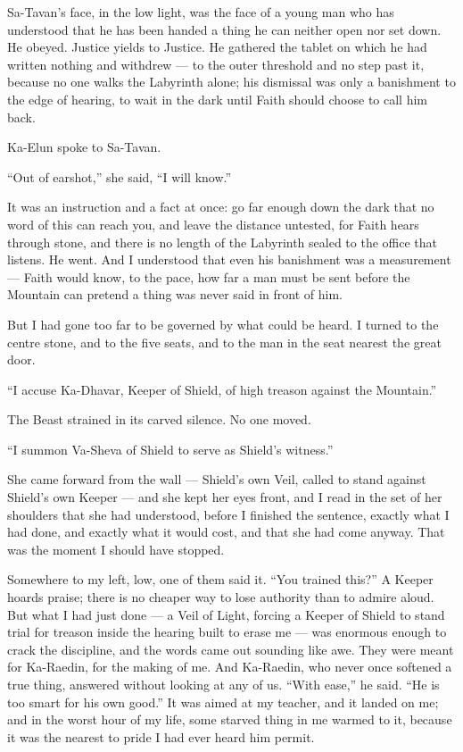 Sa-Tavan's face, in the low light, was the face of a young man who has understood that he has been handed a thing he can neither open nor set down. He obeyed.
Justice yields to Justice.
He gathered the tablet on which he had written nothing and withdrew --- to the outer threshold and no step past it, because no one walks the Labyrinth alone; 
his dismissal was only a banishment to the edge of hearing, to wait in the dark until Faith should choose to call him back. 

Ka-Elun spoke to Sa-Tavan.\par
 
``Out of earshot,'' she said, ``I will know.''\par
 
It was an instruction and a fact at once: go far enough down the dark that no word of this can reach you, and leave the distance untested, for Faith hears through stone, and there is no length of the Labyrinth sealed to the office that listens. He went. And I understood that even his banishment was a measurement --- Faith would know, to the pace, how far a man must be sent before the Mountain can pretend a thing was never said in front of him.\par
 
But I had gone too far to be governed by what could be heard. I turned to the centre stone, and to the five seats, and to the man in the seat nearest the great door.\par
 
``I accuse Ka-Dhavar, Keeper of Shield, of high treason against the Mountain.''\par
 
The Beast strained in its carved silence. No one moved.\par
 
``I summon Va-Sheva of Shield to serve as Shield's witness.''\par
 
She came forward from the wall --- Shield's own Veil, called to stand against Shield's own Keeper --- and she kept her eyes front, and I read in the set of her shoulders that she had understood, before I finished the sentence, exactly what I had done, and exactly what it would cost, and that she had come anyway. That was the moment I should have stopped. \par
 
Somewhere to my left, low, one of them said it. ``You trained this?'' A Keeper hoards praise; there is no cheaper way to lose authority than to admire aloud. But what I had just done --- a Veil of Light, forcing a Keeper of Shield to stand trial for treason inside the hearing built to erase me --- was enormous enough to crack the discipline, and the words came out sounding like awe. They were meant for Ka-Raedin, for the making of me. And Ka-Raedin, who never once softened a true thing, answered without looking at any of us. ``With ease,'' he said. ``He is too smart for his own good.'' It was aimed at my teacher, and it landed on me; and in the worst hour of my life, some starved thing in me warmed to it, because it was the nearest to pride I had ever heard him permit.\par


